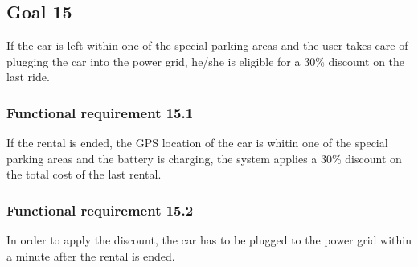 \subsection{Goal 15}
If the car is left within one of the special parking areas and the user takes care of plugging the car into the power grid, he/she is eligible for a 30\% discount on the last ride.

\setcounter{secnumdepth}{3}
\subsubsection{Functional requirement 15.1}
If the rental is ended, the GPS location of the car is whitin one of the special parking areas and the battery is charging, the system applies a 30\% discount on the total cost of the last rental.

\subsubsection{Functional requirement 15.2}
In order to apply the discount, the car has to be plugged to the power grid within a minute after the rental is ended.
